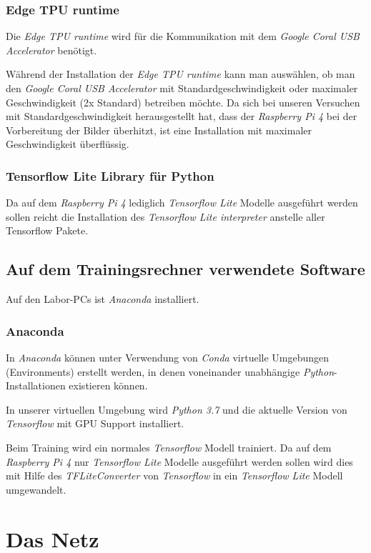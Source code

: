 \documentclass[a4paper, 12pt]{scrartcl}
\begin{document}
			\subsubsection{Edge TPU runtime}
			Die \emph{Edge TPU runtime} wird für die Kommunikation mit dem \emph{Google Coral USB Accelerator} benötigt.
			
			Während der Installation der \emph{Edge TPU runtime} kann man auswählen, ob man den \emph{Google Coral USB Accelerator} mit Standardgeschwindigkeit oder maximaler Geschwindigkeit (2x Standard) betreiben möchte. Da sich bei unseren Versuchen mit Standardgeschwindigkeit herausgestellt hat, dass der \emph{Raspberry Pi 4} bei der Vorbereitung der Bilder überhitzt, ist eine Installation mit maximaler Geschwindigkeit überflüssig.
			
			\subsubsection{Tensorflow Lite Library für Python}
			Da auf dem \emph{Raspberry Pi 4} lediglich \emph{Tensorflow Lite} Modelle ausgeführt werden sollen reicht die Installation des \emph{Tensorflow Lite interpreter} anstelle aller Tensorflow Pakete.
			
				
		
		\subsection{Auf dem Trainingsrechner verwendete Software}
		Auf den Labor-PCs ist \emph{Anaconda} installiert.
			\subsubsection{Anaconda}
			In \emph{Anaconda} können unter Verwendung von \emph{Conda} virtuelle Umgebungen (Environments) erstellt werden, in denen voneinander unabhängige \emph{Python}-Installationen existieren können. 
			
			In unserer virtuellen Umgebung wird \emph{Python 3.7} und die aktuelle Version von \emph{Tensorflow} mit GPU Support installiert.
			
			Beim Training wird ein normales \emph{Tensorflow} Modell trainiert. Da auf dem  \emph{Raspberry Pi 4} nur \emph{Tensorflow Lite} Modelle ausgeführt werden sollen wird dies mit Hilfe des \emph{TFLiteConverter} von  \emph{Tensorflow}  in ein \emph{Tensorflow Lite} Modell umgewandelt.
			
	
			
		\section{Das Netz}
\end{document}
